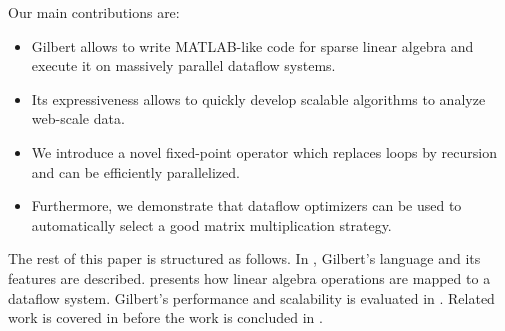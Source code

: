 Our main contributions are:

\begin{itemize}
 \item Gilbert allows to write MATLAB-like code for sparse linear algebra and execute it on massively parallel dataflow systems.
 \item Its expressiveness allows to quickly develop scalable algorithms to analyze web-scale data.
 \item We introduce a novel fixed-point operator which replaces loops by recursion and can be efficiently parallelized.
 \item Furthermore, we demonstrate that dataflow optimizers can be used to automatically select a good matrix multiplication strategy. 
\end{itemize}

The rest of this paper is structured as follows.
In , Gilbert's language and its features are described.
 presents how linear algebra operations are mapped to a dataflow system. Gilbert's performance and scalability is evaluated in .
Related work is covered in  before the work is concluded in .